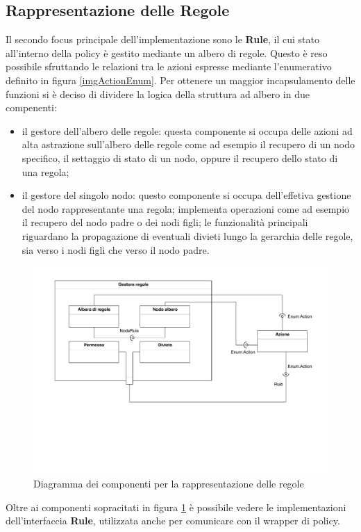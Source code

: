 \documentclass[12pt,a4paper,twoside]{book}
\begin{document}
\subsection{Rappresentazione delle Regole}\label{ruleRappr}
Il secondo focus principale dell'implementazione sono le \textbf{Rule}, il cui stato all'interno della policy è gestito mediante un albero di regole. Questo è reso possibile sfruttando le relazioni tra le azioni espresse mediante l'enumerativo definito in figura \ref{imgActionEnum}. Per ottenere un maggior incapsulamento delle funzioni si è deciso di dividere la logica della struttura ad albero in due compenenti:
\begin{itemize}
\item il gestore dell'albero delle regole: questa componente si occupa delle azioni ad alta astrazione sull'albero delle regole come ad esempio il recupero di un nodo specifico, il settaggio di stato di un nodo, oppure il recupero dello stato di una regola;
\item il gestore del singolo nodo: questo componente si occupa dell'effetiva gestione del nodo rappresentante una regola; implementa operazioni come ad esempio il recupero del nodo padre o dei nodi figli; le funzionalità principali riguardano la propagazione di eventuali divieti lungo la gerarchia delle regole, sia verso i nodi figli che verso il nodo padre.
\end{itemize}
\begin{figure}[H]
\centering
\includegraphics[scale=.60]{../immagini/imgCompRule}
\caption{Diagramma dei componenti per la rappresentazione delle regole}
\label{imgCompRule}
\end{figure}
Oltre ai componenti sopracitati in figura \ref{imgCompRule} è possibile vedere le implementazioni dell'interfaccia \textbf{Rule}, utilizzata anche per comunicare con il wrapper di policy.
\end{document}
